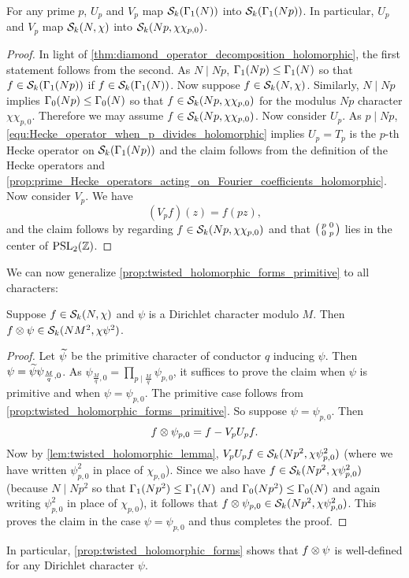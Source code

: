     \begin{lemma}\label{lem:twisted_holomorphic_lemma}
      For any prime $p$, $U_{p}$ and $V_{p}$ map $\mathcal{S}_{k}(\Gamma_{1}(N))$ into $\mathcal{S}_{k}(\Gamma_{1}(Np))$. In particular, $U_{p}$ and $V_{p}$ map $\mathcal{S}_{k}(N,\chi)$ into $\mathcal{S}_{k}(Np,\chi\chi_{p,0})$.
    \end{lemma}
    \begin{proof}
      In light of \cref{thm:diamond_operator_decomposition_holomorphic}, the first statement follows from the second. As $N \mid Np$, $\Gamma_{1}(Np) \le \Gamma_{1}(N)$ so that $f \in \mathcal{S}_{k}(\Gamma_{1}(Np))$ if $f \in \mathcal{S}_{k}(\Gamma_{1}(N))$. Now suppose $f \in \mathcal{S}_{k}(N,\chi)$. Similarly, $N \mid Np$ implies $\Gamma_{0}(Np) \le \Gamma_{0}(N)$ so that $f \in \mathcal{S}_{k}(Np,\chi\chi_{p,0})$ for the modulus $Np$ character $\chi\chi_{p,0}$. Therefore we may assume $f \in \mathcal{S}_{k}(Np,\chi\chi_{p,0})$. Now consider $U_{p}$. As $p \mid Np$, \cref{equ:Hecke_operator_when_p_divides_holomorphic} implies $U_{p} = T_{p}$ is the $p$-th Hecke operator on $\mathcal{S}_{k}(\Gamma_{1}(Np))$ and the claim follows from the definition of the Hecke operators and \cref{prop:prime_Hecke_operators_acting_on_Fourier_coefficients_holomorphic}. Now consider $V_{p}$. We have
      \[
        (V_{p}f)(z) = f(pz),
      \]
      and the claim follows by regarding $f \in \mathcal{S}_{k}(Np,\chi\chi_{p,0})$ and that $\begin{psmallmatrix} p & 0 \\ 0 & p \end{psmallmatrix}$ lies in the center of $\mathrm{PSL}_{2}(\mathbb{Z})$.
    \end{proof}

    We can now generalize \cref{prop:twisted_holomorphic_forms_primitive} to all characters:

    \begin{proposition}\label{prop:twisted_holomorphic_forms}
      Suppose $f \in \mathcal{S}_{k}(N,\chi)$ and $\psi$ is a Dirichlet character modulo $M$. Then $f \otimes \psi \in \mathcal{S}_{k}(NM^{2},\chi\psi^{2})$.
    \end{proposition}
    \begin{proof}
      Let $\widetilde{\psi}$ be the primitive character of conductor $q$ inducing $\psi$. Then $\psi = \widetilde{\psi}\psi_{\frac{M}{q},0}$. As $\psi_{\frac{M}{q},0} = \prod_{p \mid \frac{M}{q}}\psi_{p,0}$, it suffices to prove the claim when $\psi$ is primitive and when $\psi = \psi_{p,0}$. The primitive case follows from \cref{prop:twisted_holomorphic_forms_primitive}. So suppose $\psi = \psi_{p,0}$. Then
      \[
        f \otimes \psi_{p,0} = f-V_{p}U_{p}f.
      \]
      Now by \cref{lem:twisted_holomorphic_lemma}, $V_{p}U_{p}f \in \mathcal{S}_{k}(Np^{2},\chi\psi_{p,0}^{2})$ (where we have written $\psi_{p,0}^{2}$ in place of $\chi_{p,0}$). Since we also have $f \in \mathcal{S}_{k}(Np^{2},\chi\psi_{p,0}^{2})$ (because $N \mid Np^{2}$ so that $\Gamma_{1}(Np^{2}) \le \Gamma_{1}(N)$ and $\Gamma_{0}(Np^{2}) \le \Gamma_{0}(N)$ and again writing $\psi_{p,0}^{2}$ in place of $\chi_{p,0}$), it follows that $f \otimes \psi_{p,0} \in \mathcal{S}_{k}(Np^{2},\chi\psi_{p,0}^{2})$. This proves the claim in the case $\psi = \psi_{p,0}$ and thus completes the proof.
    \end{proof}

    In particular, \cref{prop:twisted_holomorphic_forms} shows that $f \otimes \psi$ is well-defined for any Dirichlet character $\psi$.